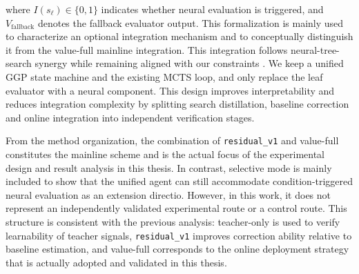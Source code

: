 
where $I(s_\ell)\in\{0,1\}$ indicates whether neural evaluation is triggered, and $V_{\mathrm{fallback}}$ denotes the fallback evaluator output. This formalization is mainly used to characterize an optional integration mechanism and to conceptually distinguish it from the value-full mainline integration.
This integration follows neural-tree-search synergy while remaining aligned with our constraints \cite{anthony2017thinking,silver2018general}. We keep a unified GGP state machine and the existing MCTS loop, and only replace the leaf evaluator with a neural component. This design improves interpretability and reduces integration complexity by splitting search distillation, baseline correction and online integration into independent verification stages.

From the method organization, the combination of \texttt{residual\_v1} and value-full constitutes the mainline scheme and is the actual focus of the experimental design and result analysis in this thesis. In contrast, selective mode is mainly included to show that the unified agent can still accommodate condition-triggered neural evaluation as an extension directio. However, in this work, it does not represent an independently validated experimental route or a control route. This structure is consistent with the previous analysis: teacher-only is used to verify learnability of teacher signals, \texttt{residual\_v1} improves correction ability relative to baseline estimation, and value-full corresponds to the online deployment strategy that is actually adopted and validated in this thesis.

